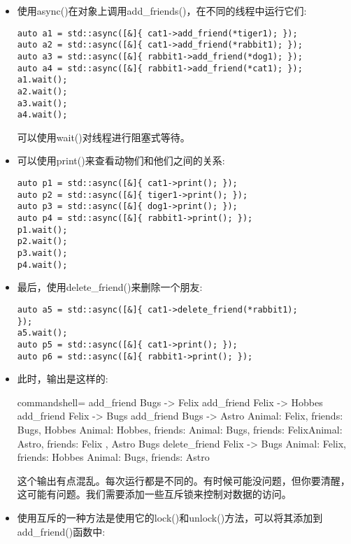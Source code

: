 \begin{itemize}
\item 
使用async()在对象上调用add\_friends()，在不同的线程中运行它们:

\begin{lstlisting}[style=styleCXX]
auto a1 = std::async([&]{ cat1->add_friend(*tiger1); });
auto a2 = std::async([&]{ cat1->add_friend(*rabbit1); });
auto a3 = std::async([&]{ rabbit1->add_friend(*dog1); });
auto a4 = std::async([&]{ rabbit1->add_friend(*cat1); });
a1.wait();
a2.wait();
a3.wait();
a4.wait();
\end{lstlisting}

可以使用wait()对线程进行阻塞式等待。

\item 
可以使用print()来查看动物们和他们之间的关系:

\begin{lstlisting}[style=styleCXX]
auto p1 = std::async([&]{ cat1->print(); });
auto p2 = std::async([&]{ tiger1->print(); });
auto p3 = std::async([&]{ dog1->print(); });
auto p4 = std::async([&]{ rabbit1->print(); });
p1.wait();
p2.wait();
p3.wait();
p4.wait();
\end{lstlisting}

\item 
最后，使用delete\_friend()来删除一个朋友:

\begin{lstlisting}[style=styleCXX]
auto a5 = std::async([&]{ cat1->delete_friend(*rabbit1);
});
a5.wait();
auto p5 = std::async([&]{ cat1->print(); });
auto p6 = std::async([&]{ rabbit1->print(); });
\end{lstlisting}

\item 
此时，输出是这样的:

\begin{tcblisting}{commandshell={}}
add_friend Bugs -> Felix
add_friend Felix -> Hobbes
add_friend Felix -> Bugs
add_friend Bugs -> Astro
Animal: Felix, friends: Bugs, Hobbes
Animal: Hobbes, friends: Animal: Bugs, friends:
FelixAnimal: Astro, friends: Felix
, Astro
Bugs
delete_friend Felix -> Bugs
Animal: Felix, friends: Hobbes
Animal: Bugs, friends: Astro
\end{tcblisting}

这个输出有点混乱。每次运行都是不同的。有时候可能没问题，但你要清醒，这可能有问题。我们需要添加一些互斥锁来控制对数据的访问。

\item 
使用互斥的一种方法是使用它的lock()和unlock()方法，可以将其添加到add\_friend()函数中:


\end{itemize}
